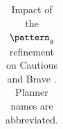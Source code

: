 \begin{table}[tb]
{\begin{tabular}{|l||cccccc||cccccc||}
        \end{tabular}}
        \caption{Impact of the $\pattern_g$ refinement on Cautious and Brave \pattyd. Planner names are abbreviated.}
        \label{tab:abl-patterng}
        \end{table}
        